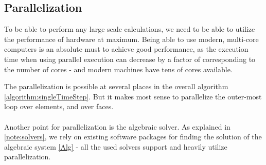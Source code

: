 \subsection{Parallelization}
\label{section:parallel}
To be able to perform any large scale calculations, we need to be able to utilize the performance of hardware at maximum. Being able to use modern, multi-core computers is an absolute must to achieve good performance, as the execution time when using parallel execution can decrease by a factor of corresponding to the number of cores - and modern machines have tens of cores available.

The parallelization is possible at several places in the overall algorithm \cref{algorithm:singleTimeStep}. But it makes most sense to parallelize the outer-most loop over elements, and over faces.

\paragraph{}
Another point for parallelization is the algebraic solver. As explained in \cref{note:solvers}, we rely on existing software packages for finding the solution of the algebraic system \cref{Alg} - all the used solvers support and heavily utilize parallelization.